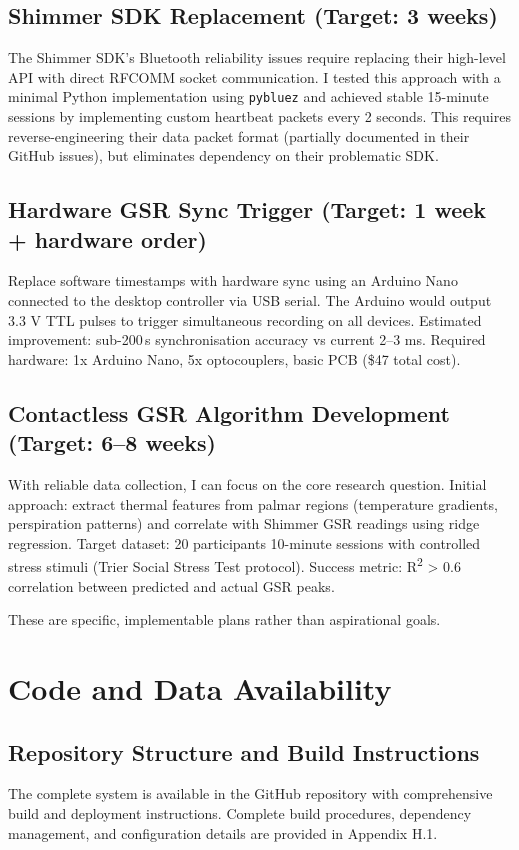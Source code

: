 \subsection{Shimmer SDK Replacement (Target: 3 weeks)}
The Shimmer SDK's Bluetooth reliability issues require replacing their high-level API with direct RFCOMM socket communication. I tested this approach with a minimal Python implementation using \texttt{pybluez} and achieved stable 15-minute sessions by implementing custom heartbeat packets every 2 seconds. This requires reverse-engineering their data packet format (partially documented in their GitHub issues), but eliminates dependency on their problematic SDK.

\subsection{Hardware GSR Sync Trigger (Target: 1 week + hardware order)}
Replace software timestamps with hardware sync using an Arduino Nano connected to the desktop controller via USB serial. The Arduino would output 3.3 V TTL pulses to trigger simultaneous recording on all devices. Estimated improvement: sub-200\,\textmu s synchronisation accuracy vs current 2--3 ms. Required hardware: 1x Arduino Nano, 5x optocouplers, basic PCB (\$47 total cost).

\subsection{Contactless GSR Algorithm Development (Target: 6--8 weeks)}
With reliable data collection, I can focus on the core research question. Initial approach: extract thermal features from palmar regions (temperature gradients, perspiration patterns) and correlate with Shimmer GSR readings using ridge regression. Target dataset: 20 participants \texttimes{} 10-minute sessions with controlled stress stimuli (Trier Social Stress Test protocol). Success metric: R\textsuperscript{2} \textgreater{} 0.6 correlation between predicted and actual GSR peaks.

These are specific, implementable plans rather than aspirational goals.


\section{Code and Data Availability}

\subsection{Repository Structure and Build Instructions}
The complete system is available in the GitHub repository with comprehensive build and deployment instructions. Complete build procedures, dependency management, and configuration details are provided in Appendix H.1.

